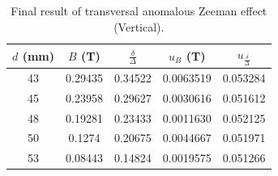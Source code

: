 \documentclass[a4paper,12pt]{article}
\begin{document}
    \begin{table}[H]
        \centering
        \caption{Side product before the final result, where $\delta$ is the average of 1 and 2 cells, and $\Delta$ is the average of 3 and 4 cells. Units are all square of pixel }
    \end{table}
    
    \begin{table}[H]
        \centering
        \caption{Final result of transversal anomalous Zeeman effect (Vertical).}
        \begin{tabular}{c|c|c|c|c}
            $d $ (mm)& $B $ (T)& $\frac{\delta}{\Delta}$ & $u_{B} $ (T)& $u_{\frac{\delta}{\Delta}} $ \\ \hline \hline
            43&0.29435&0.34522&0.0063519&0.053284  \\ \hline
            45&0.23958&0.29627&0.0030616&0.051612 \\ \hline
            48&0.19281&0.23433&0.0011630&0.052125  \\ \hline
            50&0.1274 &0.20675&0.0044667&0.051971 \\ \hline        
            53&0.08443&0.14824&0.0019575&0.051266 \\ \hline
        \end{tabular}
        \label{tab:tra_ano_final}
    \end{table}
    
\end{document}
